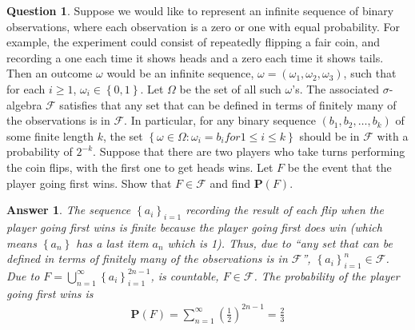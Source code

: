 \documentclass[utf8]{article}
\theoremstyle{definition}%
\newtheorem{question}{Question} %
\theoremstyle{plain}%
\newtheorem{answer}{Answer} %
\begin{document}
\begin{question}
    Suppose we would like to represent an infinite sequence of binary observations, where each observation is a zero or one with equal probability. For example, the experiment could consist of repeatedly flipping a fair coin, and recording a one each time it shows heads and a zero each time it shows tails. Then an outcome $\omega$ would be an infinite sequence, $\omega = \left(\omega_1, \omega_2, \omega_3\right)$, such that for each $i \geq 1$, $\omega_i \in \left\{0, 1\right\}$. Let $\Omega$ be the set of all such $\omega$'s. The associated $\sigma$-algebra $\mathcal{F}$ satisfies that any set that can be defined in terms of finitely many of the observations is in $\mathcal{F}$. In particular, for any binary sequence $\left(b_1, b_2, \ldots, b_k\right)$ of some finite length $k$, the set $\left\{\omega \in \Omega : \omega_i = b_i for 1 \leq i \leq k\right\}$ should be in $\mathcal{F}$ with a probability of $2^{-k}$. Suppose that there are two players who take turns performing the coin flips, with the first one to get heads wins. Let $F$ be the event that the player going first wins. Show that $F \in \mathcal{F}$ and find $\mathbf{P}\left(F\right)$.
\end{question}
\begin{answer}
    The sequence $\left\{a_i\right\}_{i=1}$ recording the result of each flip when the player going first wins is finite because the player going first does win (which means $\left\{a_n\right\}$ has a last item $a_n$ which is 1). Thus, due to ``any set that can be defined in terms of finitely many of the observations is in $\mathcal{F}$'', $\left\{a_i\right\}_{i=1}^{n} \in \mathcal{F}$. Due to $F = \bigcup_{n = 1}^{\infty} \left\{a_i\right\}_{i=1}^{2n-1}$, is countable, $F \in \mathcal{F}$. The probability of the player going first wins is
    \begin{align*}
        \mathbf{P}\left(F\right) = \sum_{n = 1}^{\infty} \left(\frac{1}{2}\right)^{2n-1} = \frac{2}{3}
    \end{align*}
\end{answer}
\end{document}

